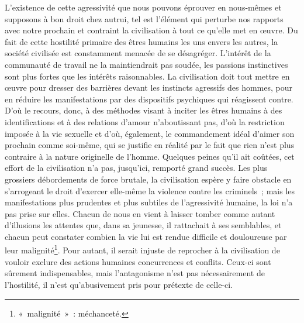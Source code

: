 {L'existence de cette agressivité que nous pouvons éprouver en
nous-mêmes et supposons à bon droit chez autrui, tel est l'élément
qui perturbe nos rapports avec notre prochain et contraint la
civilisation à tout ce qu'elle met en œuvre. Du fait de cette
hostilité primaire des êtres humains les uns envers les autres, la
société civilisée est constamment menacée de se désagréger. L'intérêt
de la communauté de travail ne la maintiendrait pas soudée, les
passions instinctives sont plus fortes que les intérêts raisonnables.
La civilisation doit tout mettre en œuvre pour dresser des barrières
devant les instincts agressifs des hommes, pour en réduire les
manifestations par des dispositifs psychiques qui réagissent contre.
D'où le recours, donc, à des méthodes visant à inciter les êtres
humains à des identifications et à des relations d'amour
n'aboutissant pas, d'où la restriction imposée à la vie sexuelle et
d'où, également, le commandement idéal d'aimer son prochain comme
soi-même, qui se justifie en réalité par le fait que rien n'est plus
contraire à la nature originelle de l'homme. Quelques peines qu'il
ait coûtées, cet effort de la civilisation n'a pas, jusqu'ici,
remporté grand succès. Les plus grossiers débordements de force
brutale, la civilisation espère y faire obstacle en s'arrogeant le
droit d'exercer elle-même la violence contre les criminels~; mais les
manifestations plus prudentes et plus subtiles de l'agressivité
humaine, la loi n'a pas prise sur elles. Chacun de nous en vient à
laisser tomber comme autant d'illusions les attentes que, dans sa
jeunesse, il rattachait à ses semblables, et chacun peut constater
combien la vie lui est rendue difficile et douloureuse par leur
malignité\footnote{«~malignité~»~: méchanceté.}. Pour autant, il serait injuste de reprocher à la
civilisation de vouloir exclure des actions humaines concurrences et
conflits. Ceux-ci sont sûrement indispensables, mais l'antagonisme
n'est pas nécessairement de l'hostilité, il n'est qu'abusivement pris
pour prétexte de celle-ci.
}

